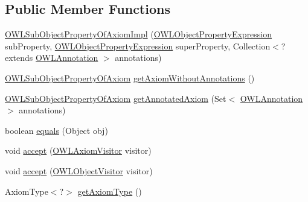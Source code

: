 \subsection*{Public Member Functions}
\begin{DoxyCompactItemize}
\item 
\hyperlink{classuk_1_1ac_1_1manchester_1_1cs_1_1owl_1_1owlapi_1_1_o_w_l_sub_object_property_of_axiom_impl_adb6613e6e1c49560dc7423126afa3efb}{O\-W\-L\-Sub\-Object\-Property\-Of\-Axiom\-Impl} (\hyperlink{interfaceorg_1_1semanticweb_1_1owlapi_1_1model_1_1_o_w_l_object_property_expression}{O\-W\-L\-Object\-Property\-Expression} sub\-Property, \hyperlink{interfaceorg_1_1semanticweb_1_1owlapi_1_1model_1_1_o_w_l_object_property_expression}{O\-W\-L\-Object\-Property\-Expression} super\-Property, Collection$<$?extends \hyperlink{interfaceorg_1_1semanticweb_1_1owlapi_1_1model_1_1_o_w_l_annotation}{O\-W\-L\-Annotation} $>$ annotations)
\item 
\hyperlink{interfaceorg_1_1semanticweb_1_1owlapi_1_1model_1_1_o_w_l_sub_object_property_of_axiom}{O\-W\-L\-Sub\-Object\-Property\-Of\-Axiom} \hyperlink{classuk_1_1ac_1_1manchester_1_1cs_1_1owl_1_1owlapi_1_1_o_w_l_sub_object_property_of_axiom_impl_a06ef98d9547a646c82813ac3bcd47b8d}{get\-Axiom\-Without\-Annotations} ()
\item 
\hyperlink{interfaceorg_1_1semanticweb_1_1owlapi_1_1model_1_1_o_w_l_sub_object_property_of_axiom}{O\-W\-L\-Sub\-Object\-Property\-Of\-Axiom} \hyperlink{classuk_1_1ac_1_1manchester_1_1cs_1_1owl_1_1owlapi_1_1_o_w_l_sub_object_property_of_axiom_impl_ab830af1d169a84eaf7da4f1fef97d08e}{get\-Annotated\-Axiom} (Set$<$ \hyperlink{interfaceorg_1_1semanticweb_1_1owlapi_1_1model_1_1_o_w_l_annotation}{O\-W\-L\-Annotation} $>$ annotations)
\item 
boolean \hyperlink{classuk_1_1ac_1_1manchester_1_1cs_1_1owl_1_1owlapi_1_1_o_w_l_sub_object_property_of_axiom_impl_a5563a495d44b4e540df3ba4190cd9ca3}{equals} (Object obj)
\item 
void \hyperlink{classuk_1_1ac_1_1manchester_1_1cs_1_1owl_1_1owlapi_1_1_o_w_l_sub_object_property_of_axiom_impl_a716f6c37e2fb6d5417fd07b814ce0735}{accept} (\hyperlink{interfaceorg_1_1semanticweb_1_1owlapi_1_1model_1_1_o_w_l_axiom_visitor}{O\-W\-L\-Axiom\-Visitor} visitor)
\item 
void \hyperlink{classuk_1_1ac_1_1manchester_1_1cs_1_1owl_1_1owlapi_1_1_o_w_l_sub_object_property_of_axiom_impl_a4cdddcd6282b26b7049dd0ea39d49442}{accept} (\hyperlink{interfaceorg_1_1semanticweb_1_1owlapi_1_1model_1_1_o_w_l_object_visitor}{O\-W\-L\-Object\-Visitor} visitor)
\item 
Axiom\-Type$<$?$>$ \hyperlink{classuk_1_1ac_1_1manchester_1_1cs_1_1owl_1_1owlapi_1_1_o_w_l_sub_object_property_of_axiom_impl_a52987c0918c6cbc8659868af82b481a3}{get\-Axiom\-Type} ()
\end{DoxyCompactItemize}
